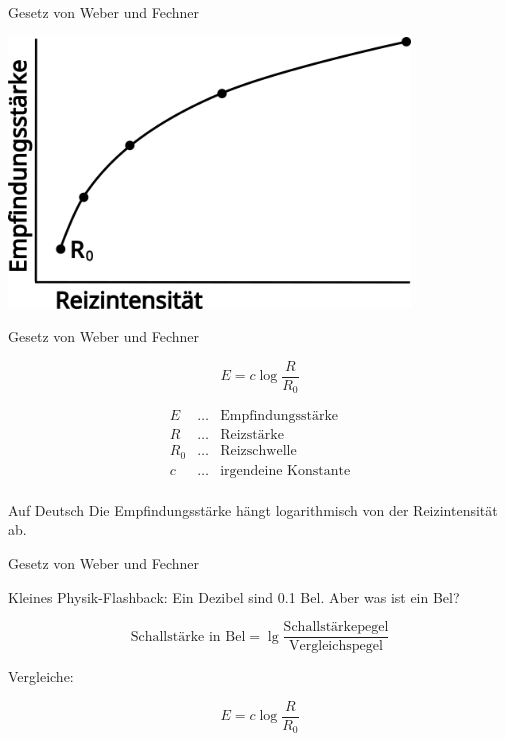 \documentclass[aspectratio=169]{beamer}
\begin{document}
\begin{frame}{Gesetz von Weber und Fechner}

\begin{center}
    \includegraphics[width=0.8\textwidth]{weber_fechner.png}
\end{center}
    


\end{frame}


\begin{frame}{Gesetz von Weber und Fechner}

\[
E = c\log \frac{R}{R_0}
\]


\[
\begin{array}{lll}
E           &\ldots    & \text{Empfindungsstärke} \\
R           & \ldots    & \text{Reizstärke} \\
R_0           & \ldots    & \text{Reizschwelle} \\
c           & \ldots    & \text{irgendeine Konstante} \\
\end{array}
\]

\begin{block}{Auf Deutsch}
Die Empfindungsstärke hängt logarithmisch von der Reizintensität ab.
\end{block}

 
\end{frame}




\begin{frame}{Gesetz von Weber und Fechner}

Kleines Physik-Flashback: Ein Dezibel sind 0.1 Bel. Aber was ist ein Bel? 



\[
\text{Schallstärke in Bel} = \lg \frac{\text{Schallstärkepegel}}{\text{Vergleichspegel}} 
\]



Vergleiche: 

\[
E = c\log \frac{R}{R_0}
\]


    
\end{frame}
\end{document}
